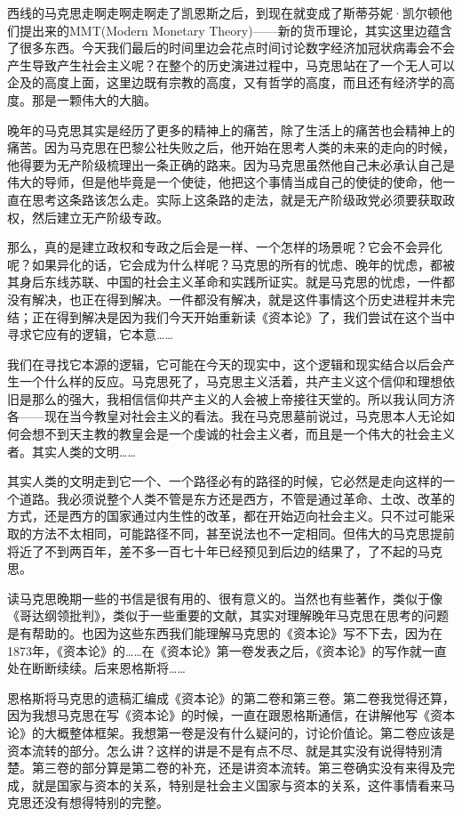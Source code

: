 \documentclass[UTF8, 12pt, a4paper]{ctexrep}
\begin{document}
西线的马克思走啊走啊走啊走了凯恩斯之后，到现在就变成了斯蒂芬妮·凯尔顿他们提出来的MMT(Modern Monetary Theory)——新的货币理论，其实这里边蕴含了很多东西。今天我们最后的时间里边会花点时间讨论数字经济加冠状病毒会不会产生导致产生社会主义呢？在整个的历史演进过程中，马克思站在了一个无人可以企及的高度上面，这里边既有宗教的高度，又有哲学的高度，而且还有经济学的高度。那是一颗伟大的大脑。

晚年的马克思其实是经历了更多的精神上的痛苦，除了生活上的痛苦也会精神上的痛苦。因为马克思在巴黎公社失败之后，他开始在思考人类的未来的走向的时候，他得要为无产阶级梳理出一条正确的路来。因为马克思虽然他自己未必承认自己是伟大的导师，但是他毕竟是一个使徒，他把这个事情当成自己的使徒的使命，他一直在思考这条路该怎么走。实际上这条路的走法，就是无产阶级政党必须要获取政权，然后建立无产阶级专政。

那么，真的是建立政权和专政之后会是一样、一个怎样的场景呢？它会不会异化呢？如果异化的话，它会成为什么样呢？马克思的所有的忧虑、晚年的忧虑，都被其身后东线苏联、中国的社会主义革命和实践所证实。就是马克思的忧虑，一件都没有解决，也正在得到解决。一件都没有解决，就是这件事情这个历史进程并未完结；正在得到解决是因为我们今天开始重新读《资本论》了，我们尝试在这个当中寻求它应有的逻辑，它本意……

我们在寻找它本源的逻辑，它可能在今天的现实中，这个逻辑和现实结合以后会产生一个什么样的反应。马克思死了，马克思主义活着，共产主义这个信仰和理想依旧是那么的强大，我相信信仰共产主义的人会被上帝接往天堂的。所以我认同方济各——现在当今教皇对社会主义的看法。我在马克思墓前说过，马克思本人无论如何会想不到天主教的教皇会是一个虔诚的社会主义者，而且是一个伟大的社会主义者。其实人类的文明……

其实人类的文明走到它一个、一个路径必有的路径的时候，它必然是走向这样的一个道路。我必须说整个人类不管是东方还是西方，不管是通过革命、土改、改革的方式，还是西方的国家通过内生性的改革，都在开始迈向社会主义。只不过可能采取的方法不太相同，可能路径不同，甚至说法也不一定相同。但伟大的马克思提前将近了不到两百年，差不多一百七十年已经预见到后边的结果了，了不起的马克思。

读马克思晚期一些的书信是很有用的、很有意义的。当然也有些著作，类似于像《哥达纲领批判》，类似于一些重要的文献，其实对理解晚年马克思在思考的问题是有帮助的。也因为这些东西我们能理解马克思的《资本论》写不下去，因为在1873年，《资本论》的……在《资本论》第一卷发表之后，《资本论》的写作就一直处在断断续续。后来恩格斯将……

恩格斯将马克思的遗稿汇编成《资本论》的第二卷和第三卷。第二卷我觉得还算，因为我想马克思在写《资本论》的时候，一直在跟恩格斯通信，在讲解他写《资本论》的大概整体框架。我想第一卷是没有什么疑问的，讨论价值论。第二卷应该是资本流转的部分。怎么讲？这样的讲是不是有点不尽、就是其实没有说得特别清楚。第三卷的部分算是第二卷的补充，还是讲资本流转。第三卷确实没有来得及完成，就是国家与资本的关系，特别是社会主义国家与资本的关系，这件事情看来马克思还没有想得特别的完整。
\end{document}
